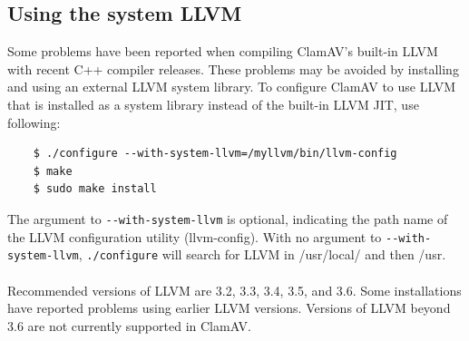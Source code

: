 \documentclass[a4paper,titlepage,12pt]{article}
\begin{document}
    \subsection{Using the system LLVM}
    Some problems have been reported when compiling ClamAV's built-in LLVM with recent
    C++ compiler releases. These problems may be avoided by installing and using
    an external LLVM system library. To configure ClamAV to use LLVM that is installed
    as a system library instead of the built-in LLVM JIT, use following: 
    \begin{verbatim}
	$ ./configure --with-system-llvm=/myllvm/bin/llvm-config
	$ make
	$ sudo make install
    \end{verbatim}
    The argument to \verb+--with-system-llvm+ is optional, indicating the path name of
    the LLVM configuration utility (llvm-config). With no argument to \verb+--with-system-llvm+,
    \verb+./configure+ will search for LLVM in /usr/local/ and then /usr.
    \\\\
    Recommended versions of LLVM are 3.2, 3.3, 3.4, 3.5, and 3.6. Some installations have
    reported problems using earlier LLVM versions. Versions of LLVM beyond 3.6 are not
    currently supported in ClamAV.
\end{document}
